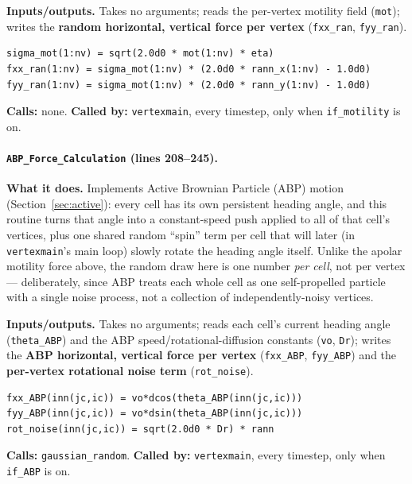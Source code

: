 \documentclass[11pt]{article}
\begin{document}
\textbf{Inputs/outputs.} Takes no arguments; reads the per-vertex motility field
(\texttt{mot}); writes the \textbf{random horizontal, vertical force per vertex}
(\texttt{fxx\_ran}, \texttt{fyy\_ran}).

\begin{lstlisting}[caption={The random motile-force draw in \texttt{Motile\_Force\_Calculation}.}]
sigma_mot(1:nv) = sqrt(2.0d0 * mot(1:nv) * eta)
fxx_ran(1:nv) = sigma_mot(1:nv) * (2.0d0 * rann_x(1:nv) - 1.0d0)
fyy_ran(1:nv) = sigma_mot(1:nv) * (2.0d0 * rann_y(1:nv) - 1.0d0)
\end{lstlisting}

\textbf{Calls:} none. \textbf{Called by:} \texttt{vertexmain}, every timestep, only
when \texttt{if\_motility} is on.

\paragraph{\texttt{ABP\_Force\_Calculation} (lines 208--245).}
\textbf{What it does.} Implements Active Brownian Particle (ABP) motion
(Section~\ref{sec:active}): every cell has its own persistent heading angle, and this
routine turns that angle into a constant-speed push applied to all of that cell's
vertices, plus one shared random ``spin'' term per cell that will later (in
\texttt{vertexmain}'s main loop) slowly rotate the heading angle itself. Unlike the
apolar motility force above, the random draw here is one number \emph{per cell}, not
per vertex --- deliberately, since ABP treats each whole cell as one self-propelled
particle with a single noise process, not a collection of independently-noisy
vertices.

\textbf{Inputs/outputs.} Takes no arguments; reads each cell's current heading angle
(\texttt{theta\_ABP}) and the ABP speed/rotational-diffusion constants
(\texttt{vo}, \texttt{Dr}); writes the \textbf{ABP horizontal, vertical force per
vertex} (\texttt{fxx\_ABP}, \texttt{fyy\_ABP}) and the \textbf{per-vertex rotational
noise term} (\texttt{rot\_noise}).

\begin{lstlisting}[caption={Turning a cell's heading angle into a force, in \texttt{ABP\_Force\_Calculation}.}]
fxx_ABP(inn(jc,ic)) = vo*dcos(theta_ABP(inn(jc,ic)))
fyy_ABP(inn(jc,ic)) = vo*dsin(theta_ABP(inn(jc,ic)))
rot_noise(inn(jc,ic)) = sqrt(2.0d0 * Dr) * rann
\end{lstlisting}

\textbf{Calls:} \texttt{gaussian\_random}. \textbf{Called by:} \texttt{vertexmain},
every timestep, only when \texttt{if\_ABP} is on.
\end{document}
